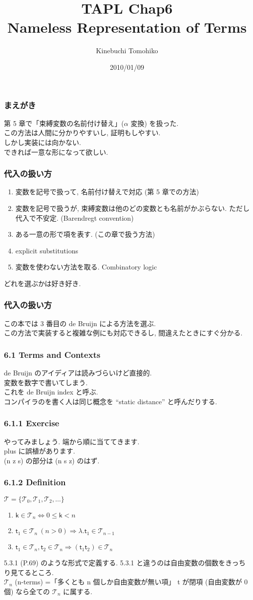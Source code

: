 \documentclass[13pt,dvipdfm]{beamer}
\title{TAPL Chap6\\Nameless Representation of Terms}
\author{Kinebuchi Tomohiko}
\date{2010/01/09}
\begin{document}
\frame{\titlepage}

\frame
{
  \frametitle{まえがき}
  第 5 章で「束縛変数の名前付け替え」($\alpha$ 変換) を扱った.\\
  この方法は人間に分かりやすいし, 証明もしやすい.\\
  しかし実装には向かない.\\
  できれば一意な形になって欲しい.
}

\frame
{
  \frametitle{代入の扱い方}
  \begin{enumerate}
  \item 変数を記号で扱って, 名前付け替えで対応 (第 5 章での方法)
  \item 変数を記号で扱うが, 束縛変数は他のどの変数とも名前がかぶらない. ただし代入で不安定. (Barendregt convention)
  \item ある一意の形で項を表す. (この章で扱う方法)
  \item explicit substitutions
  \item 変数を使わない方法を取る. Combinatory logic
  \end{enumerate}
  どれを選ぶかは好き好き.
}

\frame
{
  \frametitle{代入の扱い方}
この本では 3 番目の de Bruijn による方法を選ぶ.\\
この方法で実装すると複雑な例にも対応できるし, 間違えたときにすぐ分かる.
}

\frame
{
  \frametitle{6.1 Terms and Contexts}
  de Bruijn のアイディアは読みづらいけど直接的.\\
  変数を数字で書いてしまう.\\
  これを de Bruijn index と呼ぶ.\\
  コンパイラのを書く人は同じ概念を ``static distance'' と呼んだりする.
}

\frame
{
  \frametitle{6.1.1 Exercise}
  やってみましょう. 端から順に当ててきます.\\
  plus に誤植があります.\\
  (n z s) の部分は (n s z) のはず.
}

\frame
{
  \frametitle{6.1.2 Definition}
  
  \begin{definition}
  $\mathcal{T} = \{\mathcal{T}_0, \mathcal{T}_1, \mathcal{T}_2,\dots\}$
  \begin{enumerate}
  \item $\mathsf{k} \in \mathcal{T}_n \Leftrightarrow 0 \leq \mathsf{k} < n$
  \item $\mathsf{t}_1 \in \mathcal{T}_n\ (n > 0) \Rightarrow \lambda.\mathsf{t}_1 \in \mathcal{T}_{n-1}$
  \item $\mathsf{t}_1 \in \mathcal{T}_n, \mathsf{t}_2 \in \mathcal{T}_n \Rightarrow (\mathsf{t}_1 \mathsf{t}_2) \in \mathcal{T}_n$
  \end{enumerate}
  \end{definition}

  5.3.1 (P.69) のような形式で定義する.
  5.3.1 と違うのは自由変数の個数をきっちり見てるところ.\\
  $\mathcal{T}_n$ (n-terms) =「多くとも n 個しか自由変数が無い項」
  t が閉項 (自由変数が 0 個) なら全ての $\mathcal{T}_n$ に属する.
}
\end{document}
